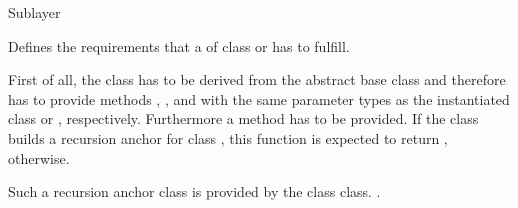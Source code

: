 \begin{ccRefConcept}{Sublayer}

\ccDefinition

Defines the requirements that a
 of class 
or  has to fulfill.

First of all, the class has to be derived from the abstract base
class  and therefore
has to provide  methods
, ,
 and
with the same parameter types as the instantiated class
 or ,
respectively.
Furthermore a method  has to be provided. If the  class
 builds a recursion anchor for class
, this function is expected to
return ,  otherwise.

Such a recursion anchor class is provided by the class  class.
.
\end{ccRefConcept}
